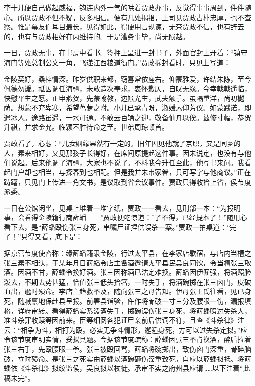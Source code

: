 \begin{parag}
    李十儿便自己做起威福，钩连内外一气的哄着贾政办事，反觉得事事周到，件件随心。所以贾政不但不疑，反多相信。便有几处揭报，上司见贾政古朴忠厚，也不查察。惟是幕友们耳目最长，见得如此，得便用言规谏，无奈贾政不信，也有辞去的，也有与贾政相好在内维持的。于是漕务事毕，尚无陨越。
\end{parag}


\begin{parag}
    一日，贾政无事，在书房中看书。签押上呈进一封书子，外面官封上开着：“镇守海门等处总制公文一角，飞递江西粮道衙门。”贾政拆封看时，只见上写道：
\end{parag}


\begin{qute2sp}
    金陵契好，桑梓情深。昨岁供职来都，窃喜常依座右。仰蒙雅爱，许结朱陈，至今佩德勿谖。祗因调任海疆，未敢造次奉求，衷怀歉仄，自叹无缘。今幸戟戟遥临，快慰平生之愿。正申燕贺，先蒙翰教，边帐光生，武夫额手。虽隔重洋，尚叨樾荫。想蒙不弃卑寒，希望茑萝之附。小儿已承青盼，淑媛素仰芳仪。如蒙践诺，即遣冰人。途路虽遥，一水可通。不敢云百辆之迎，敬备仙舟以俟。兹修寸幅，恭贺升祺，并求金允。临颖不胜待命之至。世弟周琼顿首。
\end{qute2sp}


\begin{parag}
    贾政看了，心想：“儿女姻缘果然有一定的。旧年因见他就了京职，又是同乡的人，素来相好，又见那孩子长得好，在席间原提起这件事。因未说定，也没有与他们说起。后来他调了海疆，大家也不说了。不料我今升任至此，他写书来问。我看起门户却也相当，与探春到也相配。但是我并未带家眷，只可写字与他商议。”正在踌躇，只见门上传进一角文书，是议取到省会议事件。贾政只得收拾上省，侯节度派委。
\end{parag}


\begin{parag}
    一日在公馆闲坐，见桌上堆着一堆字纸，贾政一一看去，见刑部一本：“为报明事，会看得金陵籍行商薛蟠——”贾政便吃惊道：“了不得，已经提本了！”随用心看下去，是“薛蟠殴伤张三身死，串嘱尸证捏供误杀一案。”贾政一拍桌道：“完了！”只得又看，底下是：
\end{parag}


\begin{qute2sp}
    据京营节度使咨称：缘薛蟠籍隶金陵，行过太平县，在李家店歇宿，与店内当槽之张三素不相认，于某年月日薛蟠令店主备酒邀请太平县民吴良同饮，令当槽张三取酒。因酒不甘，薛蟠令换好酒。张三因称酒已沽定难换。薛蟠因伊倔强，将酒照脸泼去，不期去势甚猛，恰值张三低头拾箸，一时失手，将酒碗掷在张三囟门，皮破血出，逾时殒命。李店主趋救不及，随向张三之母告知。伊母张王氏往看，见已身死，随喊禀地保赴县呈报。前署县诣验，仵作将骨破一寸三分及腰眼一伤，漏报填格，详府审转。看得薛蟠实系泼酒失手，掷碗误伤张三身死，将薛蟠照过失杀人，准斗杀罪收赎等因前来。臣等细阅各犯证尸亲前后供词不符，且查《斗杀律》注云：“相争为斗，相打为殴。必实无争斗情形，邂逅身死，方可以过失杀定拟。”应令该节度审明实情，妥拟具题。今据该节度疏称：薛蟠因张三不肯换酒，醉后拉着张三右手，先殴腰眼一拳。张三被殴回骂，薛蟠将碗掷出，致伤囟门深重，骨碎脑破，立时殒命。是张三之死实由薛蟠以酒碗砸伤深重致死，自应以薛蟠拟抵。将薛蟠依《斗杀律》拟绞监侯，吴良拟以杖徒。承审不实之府州县应请……以下注着“此稿未完”。
\end{qute2sp}


